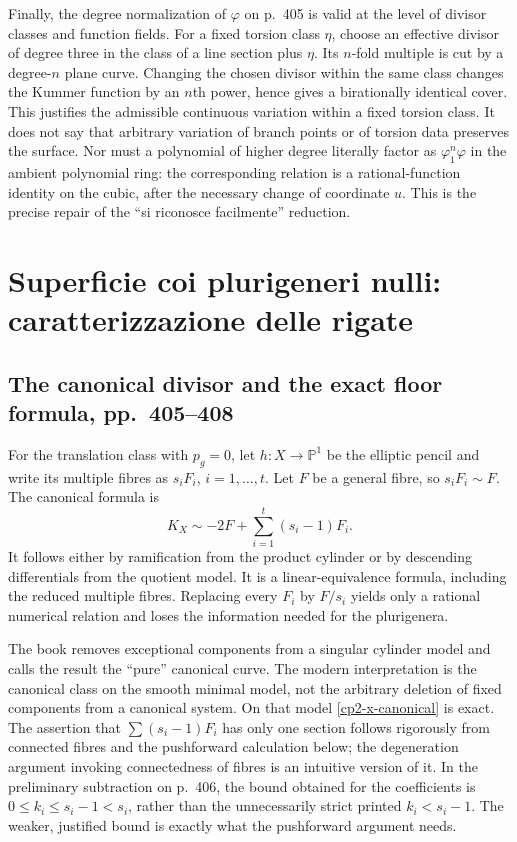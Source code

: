 Finally, the degree normalization of $\varphi$ on p.~405 is valid at the level of divisor classes and function fields. For a fixed torsion class $\eta$, choose an effective divisor of degree three in the class of a line section plus $\eta$. Its $n$-fold multiple is cut by a degree-$n$ plane curve. Changing the chosen divisor within the same class changes the Kummer function by an $n$th power, hence gives a birationally identical cover. This justifies the admissible continuous variation within a fixed torsion class. It does not say that arbitrary variation of branch points or of torsion data preserves the surface. Nor must a polynomial of higher degree literally factor as $\varphi_1^n\varphi$ in the ambient polynomial ring: the corresponding relation is a rational-function identity on the cubic, after the necessary change of coordinate $u$. This is the precise repair of the ``si riconosce facilmente'' reduction.

\section{Superficie coi plurigeneri nulli: caratterizzazione delle rigate}
\label{cp2-x-14}

\subsection{The canonical divisor and the exact floor formula, pp.~405--408}

For the translation class with $p_g=0$, let $h:X\to\mathbb P^1$ be the elliptic pencil and write its multiple fibres as $s_iF_i$, $i=1,\ldots,t$. Let $F$ be a general fibre, so $s_iF_i\sim F$. The canonical formula is
\begin{equation}
\label{cp2-x-canonical}
 K_X\sim-2F+\sum_{i=1}^t(s_i-1)F_i.
\end{equation}
It follows either by ramification from the product cylinder or by descending differentials from the quotient model. It is a linear-equivalence formula, including the reduced multiple fibres. Replacing every $F_i$ by $F/s_i$ yields only a rational numerical relation and loses the information needed for the plurigenera.

The book removes exceptional components from a singular cylinder model and calls the result the ``pure'' canonical curve. The modern interpretation is the canonical class on the smooth minimal model, not the arbitrary deletion of fixed components from a canonical system. On that model \eqref{cp2-x-canonical} is exact. The assertion that $\sum(s_i-1)F_i$ has only one section follows rigorously from connected fibres and the pushforward calculation below; the degeneration argument invoking connectedness of fibres is an intuitive version of it. In the preliminary subtraction on p.~406, the bound obtained for the coefficients is $0\leq k_i\leq s_i-1<s_i$, rather than the unnecessarily strict printed $k_i<s_i-1$. The weaker, justified bound is exactly what the pushforward argument needs.

